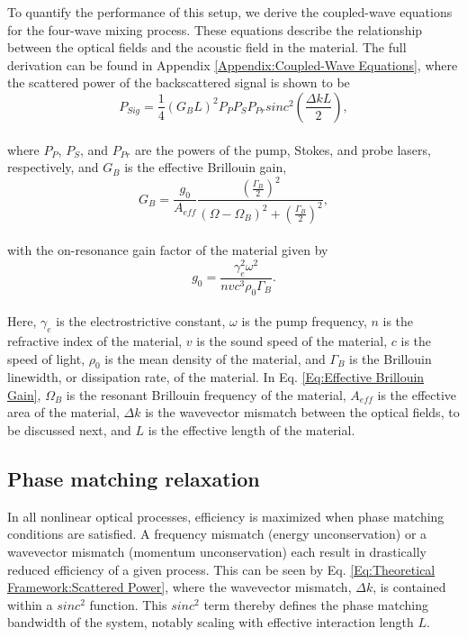 \documentclass[%
  reprint,
  superscriptaddress,
  amsmath,amssymb,
  aps,
  prapplied,
]{revtex4-2}
\begin{document}
To quantify the performance of this setup, we derive the coupled-wave equations for the four-wave mixing process. These equations describe the relationship between the optical fields and the acoustic field in the material. The full derivation can be found in Appendix \ref{Appendix:Coupled-Wave Equations}, where the scattered power of the backscattered signal is shown to be
\\
\begin{equation}
  P_{Sig} = \frac{1}{4}(G_{B}L)^{2}P_{P}P_{S}P_{Pr}sinc^{2}\left(\frac{\Delta kL}{2}\right),
  \label{Eq:Theoretical Framework:Scattered Power} %
\end{equation}
\\
where $P_{P}$, $P_{S}$, and $P_{Pr}$ are the powers of the pump, Stokes, and probe lasers, respectively, and $G_{B}$ is the effective Brillouin gain,
\\
\begin{equation}
  G_{B} = \frac{g_{0}}{A_{eff}}\frac{\left(\frac{\Gamma_{B}}{2}\right)^{2}}{(\Omega - \Omega_{B})^{2} + \left(\frac{\Gamma_{B}}{2}\right)^{2}},
  \label{Eq:Effective Brillouin Gain}
\end{equation}
\\
with the on-resonance gain factor of the material given by
\\
\begin{equation}
  g_{0} = \frac{\gamma_{e}^{2}\omega^{2}}{nvc^{3}\rho_{0}\Gamma_{B}}.
\end{equation}
\\
Here, $\gamma_{e}$ is the electrostrictive constant, $\omega$ is the pump frequency, $n$ is the refractive index of the material, $v$ is the sound speed of the material, $c$ is the speed of light, $\rho_{0}$ is the mean density of the material, and $\Gamma_{B}$ is the Brillouin linewidth, or dissipation rate, of the material. In Eq. \ref{Eq:Effective Brillouin Gain}, $\Omega_{B}$ is the resonant Brillouin frequency of the material, $A_{eff}$ is the effective area of the material, $\Delta k$ is the wavevector mismatch between the optical fields, to be discussed next, and $L$ is the effective length of the material.


\subsection*{Phase matching relaxation}
\label{Theoretical Framework: Phase matching relaxation}
In all nonlinear optical processes, efficiency is maximized when phase matching conditions are satisfied. A frequency mismatch (energy unconservation) or a wavevector mismatch (momentum unconservation) each result in drastically reduced efficiency of a given process.\cite{maker1962effects} This can be seen by Eq. \ref{Eq:Theoretical Framework:Scattered Power}, where the wavevector mismatch, $\Delta k$, is contained within a $sinc^{2}$ function. This $sinc^{2}$ term thereby defines the phase matching bandwidth of the system, notably scaling with effective interaction length $L$.
\end{document}
